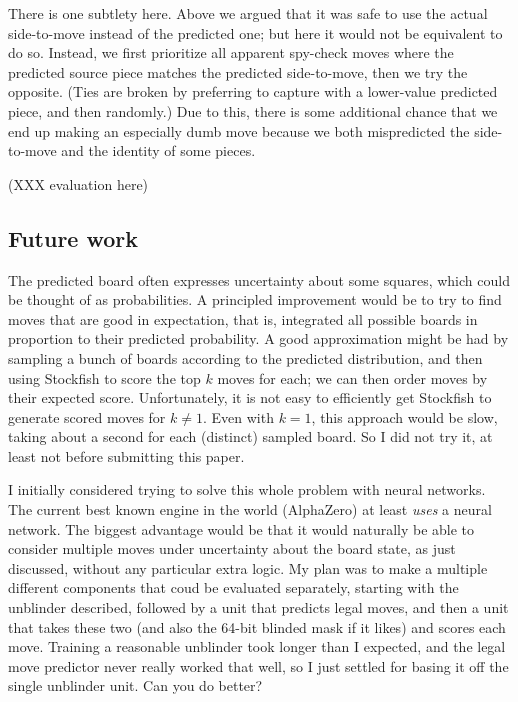 \documentclass[twocolumn]{amsart}
\begin{document}
There is one subtlety here. Above we argued that it was safe to use
the actual side-to-move instead of the predicted one; but here it
would not be equivalent to do so. Instead, we first prioritize all
apparent spy-check moves where the predicted source piece matches the
predicted side-to-move, then we try the opposite. (Ties are broken by
preferring to capture with a lower-value predicted piece, and then
randomly.) Due to this, there is some additional chance that we end up
making an especially dumb move because we both mispredicted the
side-to-move and the identity of some pieces.

(XXX evaluation here)

\subsection{Future work}

The predicted board often expresses uncertainty about some squares,
which could be thought of as probabilities. A principled improvement
would be to try to find moves that are good in expectation, that is,
integrated all possible boards in proportion to their predicted
probability. A good approximation might be had by sampling a bunch
of boards according to the predicted distribution, and then using
Stockfish to score the top $k$ moves for each; we can then order
moves by their expected score. Unfortunately, it is not easy to
efficiently get Stockfish to generate scored moves for $k \neq 1$.
Even with $k = 1$, this approach would be slow, taking about a
second for each (distinct) sampled board. So I did not try it,
at least not before submitting this paper.


\medskip
I initially considered trying to solve this whole problem with neural
networks. The current best known engine in the world (AlphaZero) at
least {\em uses} a neural network.
The biggest advantage would be that it would naturally be able to
consider multiple moves under uncertainty about the board state, as
just discussed, without any particular extra logic. My plan was to
make a multiple different components that coud be evaluated
separately, starting with the unblinder described, followed by a unit
that predicts legal moves, and then a unit that takes these two (and
also the 64-bit blinded mask if it likes) and scores each move.
Training a reasonable unblinder took longer than I expected, and the
legal move predictor never really worked that well,
so I just settled for basing it off the single unblinder unit. Can you
do better?
\end{document}
